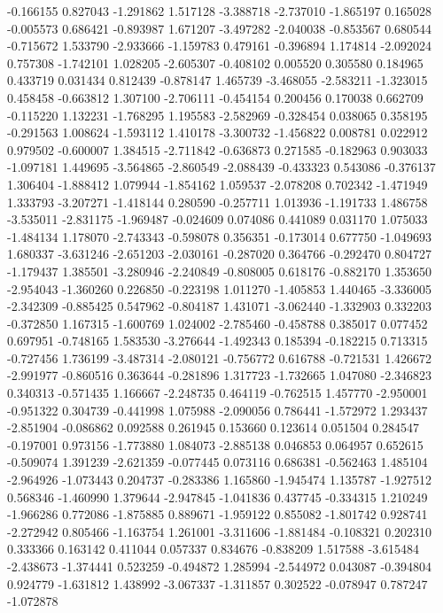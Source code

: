 -0.166155
0.827043
-1.291862
1.517128
-3.388718
-2.737010
-1.865197
0.165028
-0.005573
0.686421
-0.893987
1.671207
-3.497282
-2.040038
-0.853567
0.680544
-0.715672
1.533790
-2.933666
-1.159783
0.479161
-0.396894
1.174814
-2.092024
0.757308
-1.742101
1.028205
-2.605307
-0.408102
0.005520
0.305580
0.184965
0.433719
0.031434
0.812439
-0.878147
1.465739
-3.468055
-2.583211
-1.323015
0.458458
-0.663812
1.307100
-2.706111
-0.454154
0.200456
0.170038
0.662709
-0.115220
1.132231
-1.768295
1.195583
-2.582969
-0.328454
0.038065
0.358195
-0.291563
1.008624
-1.593112
1.410178
-3.300732
-1.456822
0.008781
0.022912
0.979502
-0.600007
1.384515
-2.711842
-0.636873
0.271585
-0.182963
0.903033
-1.097181
1.449695
-3.564865
-2.860549
-2.088439
-0.433323
0.543086
-0.376137
1.306404
-1.888412
1.079944
-1.854162
1.059537
-2.078208
0.702342
-1.471949
1.333793
-3.207271
-1.418144
0.280590
-0.257711
1.013936
-1.191733
1.486758
-3.535011
-2.831175
-1.969487
-0.024609
0.074086
0.441089
0.031170
1.075033
-1.484134
1.178070
-2.743343
-0.598078
0.356351
-0.173014
0.677750
-1.049693
1.680337
-3.631246
-2.651203
-2.030161
-0.287020
0.364766
-0.292470
0.804727
-1.179437
1.385501
-3.280946
-2.240849
-0.808005
0.618176
-0.882170
1.353650
-2.954043
-1.360260
0.226850
-0.223198
1.011270
-1.405853
1.440465
-3.336005
-2.342309
-0.885425
0.547962
-0.804187
1.431071
-3.062440
-1.332903
0.332203
-0.372850
1.167315
-1.600769
1.024002
-2.785460
-0.458788
0.385017
0.077452
0.697951
-0.748165
1.583530
-3.276644
-1.492343
0.185394
-0.182215
0.713315
-0.727456
1.736199
-3.487314
-2.080121
-0.756772
0.616788
-0.721531
1.426672
-2.991977
-0.860516
0.363644
-0.281896
1.317723
-1.732665
1.047080
-2.346823
0.340313
-0.571435
1.166667
-2.248735
0.464119
-0.762515
1.457770
-2.950001
-0.951322
0.304739
-0.441998
1.075988
-2.090056
0.786441
-1.572972
1.293437
-2.851904
-0.086862
0.092588
0.261945
0.153660
0.123614
0.051504
0.284547
-0.197001
0.973156
-1.773880
1.084073
-2.885138
0.046853
0.064957
0.652615
-0.509074
1.391239
-2.621359
-0.077445
0.073116
0.686381
-0.562463
1.485104
-2.964926
-1.073443
0.204737
-0.283386
1.165860
-1.945474
1.135787
-1.927512
0.568346
-1.460990
1.379644
-2.947845
-1.041836
0.437745
-0.334315
1.210249
-1.966286
0.772086
-1.875885
0.889671
-1.959122
0.855082
-1.801742
0.928741
-2.272942
0.805466
-1.163754
1.261001
-3.311606
-1.881484
-0.108321
0.202310
0.333366
0.163142
0.411044
0.057337
0.834676
-0.838209
1.517588
-3.615484
-2.438673
-1.374441
0.523259
-0.494872
1.285994
-2.544972
0.043087
-0.394804
0.924779
-1.631812
1.438992
-3.067337
-1.311857
0.302522
-0.078947
0.787247
-1.072878
